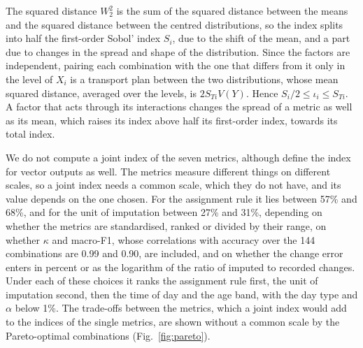 \documentclass[a4paper]{article}
\begin{document}
The squared distance $W_2^2$ is the sum of the squared distance between the means and the squared distance between the centred distributions, so the index splits into half the first-order Sobol' index $S_i$, due to the shift of the mean, and a part due to changes in the spread and shape of the distribution. Since the factors are independent, pairing each combination with the one that differs from it only in the level of $X_i$ is a transport plan between the two distributions, whose mean squared distance, averaged over the levels, is $2 S_{Ti} V(Y)$. Hence $S_i/2 \le \iota_i \le S_{Ti}$. A factor that acts through its interactions changes the spread of a metric as well as its mean, which raises its index above half its first-order index, towards its total index.

We do not compute a joint index of the seven metrics, although \textcite{borgonovoGlobalSensitivityAnalysis2025} define the index for vector outputs as well. The metrics measure different things on different scales, so a joint index needs a common scale, which they do not have, and its value depends on the one chosen. For the assignment rule it lies between 57\% and 68\%, and for the unit of imputation between 27\% and 31\%, depending on whether the metrics are standardised, ranked or divided by their range, on whether $\kappa$ and macro-F1, whose correlations with accuracy over the 144 combinations are 0.99 and 0.90, are included, and on whether the change error enters in percent or as the logarithm of the ratio of imputed to recorded changes. Under each of these choices it ranks the assignment rule first, the unit of imputation second, then the time of day and the age band, with the day type and $\alpha$ below 1\%. The trade-offs between the metrics, which a joint index would add to the indices of the single metrics, are shown without a common scale by the Pareto-optimal combinations (Fig.~\ref{fig:pareto}).
\end{document}
